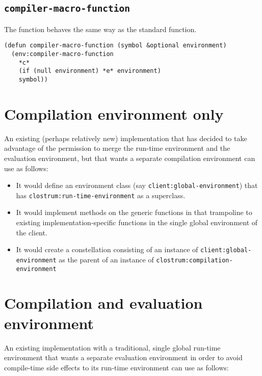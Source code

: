 \subsection{\texttt{compiler-macro-function}}

The \sysname{} function behaves the same way as the standard function.

\begin{verbatim}
(defun compiler-macro-function (symbol &optional environment)
  (env:compiler-macro-function
    *c*
    (if (null environment) *e* environment)
    symbol))
\end{verbatim}

\section{Compilation environment only}

An existing (perhaps relatively new) \commonlisp{} implementation that
has decided to take advantage of the permission to merge the run-time
environment and the evaluation environment, but that wants a separate
compilation environment can use \sysname{} as follows:

\begin{itemize}
\item It would define an environment class  (say
  \texttt{client:global-environment}) that has
  \texttt{clostrum:run-time-environment} as a superclass.
\item It would implement methods on the generic functions in
   that trampoline to existing
  implementation-specific functions in the single global environment
  of the client.
\item It would create a constellation consisting of an instance of
  \texttt{client:global-environment} as the parent of an instance of
  \texttt{clostrum:compilation-environment}
\end{itemize}

\section{Compilation and evaluation environment}

An existing \commonlisp{} implementation with a traditional, single
global run-time environment that wants a separate evaluation
environment in order to avoid compile-time side effects to its
run-time environment can use \sysname{} as follows:

